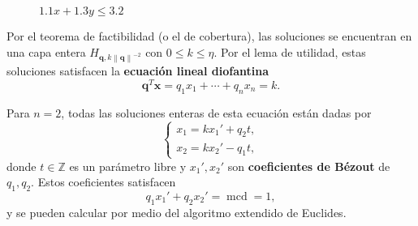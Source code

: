 \documentclass[aspectratio=169,professionalfonts]{beamer}
\newcommand{\Z}{\mathbb{Z}}
\newcommand{\norm}[1]{\left\lVert #1 \right\rVert}
\renewcommand{\vec}[1]{\boldsymbol{#1}}
\newcommand{\clayer}[2]{H_{#1, #2}}
\newcommand{\qlayer}[2]{\clayer{\vec{#1}}{#2\norm{\vec{#1}}^{-2}}}
\renewcommand{\gcd}[1]{\mathop{\mathrm{mcd}{\left\lbrace #1 \right\rbrace}}}
\begin{document}
\begin{frame}
\begin{minipage}{0.45\textwidth}
\begin{figure}
			\caption*{$1.1x + 1.3y \leq 3.2$}
		\end{figure}
	\end{minipage}
\end{frame}

\begin{frame}
	Por el teorema de factibilidad (o el de cobertura), las soluciones se
	encuentran en una capa entera $\qlayer{q}{k}$ con $0 \leq k \leq \eta$. Por
	el lema de utilidad, estas soluciones satisfacen la \textbf{ecuación lineal
	diofantina}
	\begin{equation*}
		\vec{q}^T\vec{x} = q_1x_1 + \cdots + q_nx_n = k.
	\end{equation*}
\end{frame}

\begin{frame}
	Para $n = 2$, todas las soluciones enteras de esta ecuación están dadas por
	\begin{equation*}
		\begin{cases}
			x_1 = kx_1' + q_2t, \\
			x_2 = kx_2' - q_1t,
		\end{cases}
	\end{equation*}
	donde $t \in \Z$ es un parámetro libre y $x_1', x_2'$ son
	\textbf{coeficientes de Bézout} de $q_1, q_2$. Estos coeficientes satisfacen
	\begin{equation*}
		q_1x_1' + q_2x_2' = \gcd{q_1, q_2} = 1,
	\end{equation*}
	y se pueden calcular por medio del algoritmo extendido de Euclides.
\end{frame}
\end{document}
